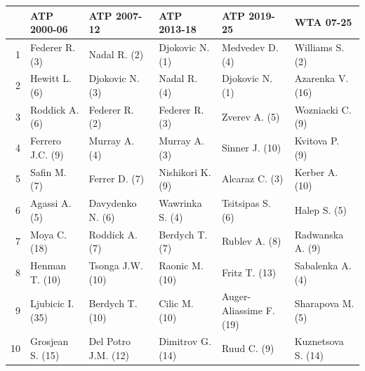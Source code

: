 \begin{tabular}{@{}rlllll@{}}
\toprule
 & ATP 2000-06 & ATP 2007-12 & ATP 2013-18 & ATP 2019-25 & WTA 07-25 \\
\midrule
1 & Federer R. (3) & Nadal R. (2) & Djokovic N. (1) & Medvedev D. (4) & Williams S. (2) \\
2 & Hewitt L. (6) & Djokovic N. (3) & Nadal R. (4) & Djokovic N. (1) & Azarenka V. (16) \\
3 & Roddick A. (6) & Federer R. (2) & Federer R. (3) & Zverev A. (5) & Wozniacki C. (9) \\
4 & Ferrero J.C. (9) & Murray A. (4) & Murray A. (3) & Sinner J. (10) & Kvitova P. (9) \\
5 & Safin M. (7) & Ferrer D. (7) & Nishikori K. (9) & Alcaraz C. (3) & Kerber A. (10) \\
6 & Agassi A. (5) & Davydenko N. (6) & Wawrinka S. (4) & Tsitsipas S. (6) & Halep S. (5) \\
7 & Moya C. (18) & Roddick A. (7) & Berdych T. (7) & Rublev A. (8) & Radwanska A. (9) \\
8 & Henman T. (10) & Tsonga J.W. (10) & Raonic M. (10) & Fritz T. (13) & Sabalenka A. (4) \\
9 & Ljubicic I. (35) & Berdych T. (10) & Cilic M. (10) & Auger-Aliassime F. (19) & Sharapova M. (5) \\
10 & Grosjean S. (15) & Del Potro J.M. (12) & Dimitrov G. (14) & Ruud C. (9) & Kuznetsova S. (14) \\
\bottomrule
\end{tabular}
